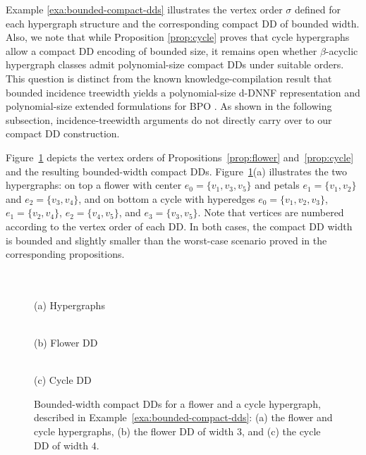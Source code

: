 Example \ref{exa:bounded-compact-dds} illustrates the vertex order $\sigma$ defined for each hypergraph structure and the corresponding compact DD of bounded width. Also, we note that while  Proposition \ref{prop:cycle} proves that cycle hypergraphs allow a compact DD encoding of bounded size, it remains open whether $\beta$-acyclic hypergraph classes admit polynomial-size compact DDs under suitable orders. This question is distinct from the known knowledge-compilation result that bounded incidence treewidth yields a polynomial-size d-DNNF representation and polynomial-size extended formulations for BPO \cite{capelliDelPiaDiGregorio2024kc}. As shown in the following subsection, incidence-treewidth arguments do not directly carry over to our compact DD construction.


\begin{example}\label{exa:bounded-compact-dds}
Figure~\ref{fig:dd-structures} depicts the vertex orders of Propositions~\ref{prop:flower} and~\ref{prop:cycle} and the resulting bounded-width compact DDs. Figure~\ref{fig:dd-structures}(a) illustrates the two hypergraphs: on top a flower with center $e_0=\{v_1,v_3,v_5\}$ and petals $e_1=\{v_1,v_2\}$ and $e_2=\{v_3,v_4\}$, and on bottom a cycle with hyperedges $e_0=\{v_1,v_2,v_3\}$, $e_1=\{v_2,v_4\}$, $e_2=\{v_4,v_5\}$, and $e_3=\{v_3,v_5\}$. Note that vertices are numbered according to the vertex order of each DD. In both cases, the  compact DD width is bounded and slightly smaller than the worst-case scenario proved in the corresponding propositions. 
\end{example}

\begin{figure}[t]
    \centering
    \begin{minipage}[b]{0.20\linewidth}\centering
        \resizebox{\linewidth}{!}{}\\
        \resizebox{\linewidth}{!}{}\\
        [2pt]
        {\small (a) Hypergraphs}
    \end{minipage}\hfill
    \begin{minipage}[b]{0.30\linewidth}\centering
        \resizebox{\linewidth}{!}{}\\[3pt]
        {\small (b) Flower DD}
    \end{minipage}\hfill
    \begin{minipage}[b]{0.40\linewidth}\centering
        \resizebox{\linewidth}{!}{}\\[3pt]
        {\small (c) Cycle DD}
    \end{minipage}
    \caption{Bounded-width compact DDs for a flower and a cycle hypergraph, described in
    Example~\ref{exa:bounded-compact-dds}: (a) the flower and cycle hypergraphs, (b) the
    flower DD of width $3$, and (c) the cycle DD of width $4$.}
    \label{fig:dd-structures}
\end{figure}

